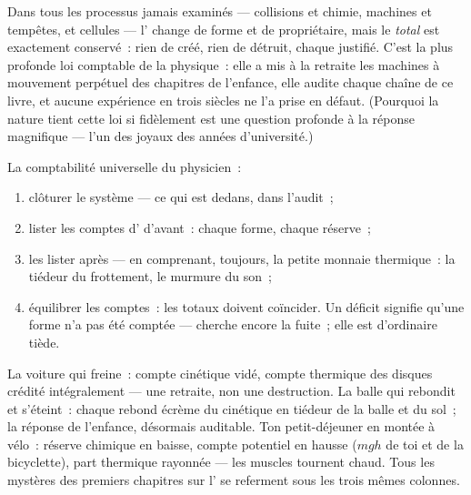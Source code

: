 \begin{proposition}\label{prop:g9:energy-conversions:conservation}
Dans tous les processus jamais examinés --- collisions et chimie,
machines et tempêtes,  et cellules --- l' change de
forme et de propriétaire, mais le \emph{total} est exactement
conservé~: rien de créé, rien de détruit, chaque  justifié.
C'est la plus profonde loi comptable de la physique~: elle a mis à la
retraite les machines à mouvement perpétuel des chapitres de
l'enfance, elle audite chaque chaîne de ce livre, et aucune expérience
en trois siècles ne l'a prise en défaut. (Pourquoi la nature tient
cette loi si fidèlement est une question profonde à la réponse
magnifique --- l'un des joyaux des années d'université.)
\end{proposition}

\begin{method}\label{met:g9:energy-conversions:audit}
La comptabilité universelle du physicien~:
\begin{enumerate}
  \item clôturer le système --- ce qui est dedans, dans l'audit~;
  \item lister les comptes d' d'avant~: chaque forme, chaque
        réserve~;
  \item les lister après --- en comprenant, toujours, la petite
        monnaie thermique~: la tiédeur du frottement, le murmure du
        son~;
  \item équilibrer les comptes~: les totaux doivent coïncider. Un
        déficit signifie qu'une forme n'a pas été comptée ---
        cherche encore la fuite~; elle est d'ordinaire tiède.
\end{enumerate}
\end{method}

\begin{example}\label{ex:g9:energy-conversions:audits}
La voiture qui freine~: compte cinétique vidé, compte thermique des
disques crédité intégralement --- une retraite, non une destruction.
La balle qui rebondit et s'éteint~: chaque rebond écrème du cinétique
en tiédeur de la balle et du sol~; la réponse de l'enfance, désormais
auditable. Ton petit-déjeuner en montée à vélo~: réserve chimique en
baisse, compte potentiel en hausse ($m g h$ de toi et de la
bicyclette), part thermique rayonnée --- les muscles tournent chaud.
Tous les mystères des premiers chapitres sur l' se referment
sous les trois mêmes colonnes.
\end{example}

